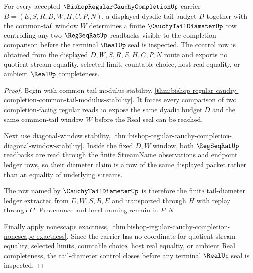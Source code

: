 \begin{theorem}
\label{thm:bishop-regular-cauchy-completion-tail-diameter-control}
For every accepted $\BishopRegularCauchyCompletionUp$ carrier $B=(E,S,R,D,W,H,C,P,N)$, a displayed dyadic tail budget $D$ together with the common-tail window $W$ determines a finite $\CauchyTailDiameterUp$ row controlling any two $\RegSeqRatUp$ readbacks visible to the completion comparison before the terminal $\RealUp$ seal is inspected. The control row is obtained from the displayed $D,W,S,R,E,H,C,P,N$ route and exports no quotient stream equality, selected limit, countable choice, host real equality, or ambient $\RealUp$ completeness.
\end{theorem}
\begin{proof}
Begin with common-tail modulus stability, \autoref{thm:bishop-regular-cauchy-completion-common-tail-modulus-stability}. It forces every comparison of two completion-facing regular reads to expose the same dyadic budget $D$ and the same common-tail window $W$ before the Real seal can be reached.

Next use diagonal-window stability, \autoref{thm:bishop-regular-cauchy-completion-diagonal-window-stability}. Inside the fixed $D,W$ window, both $\RegSeqRatUp$ readbacks are read through the finite StreamName observations and endpoint ledger rows, so their diameter claim is a row of the same displayed packet rather than an equality of underlying streams.

The row named by $\CauchyTailDiameterUp$ is therefore the finite tail-diameter ledger extracted from $D,W,S,R,E$ and transported through $H$ with replay through $C$. Provenance and local naming remain in $P,N$.

Finally apply nonescape exactness, \autoref{thm:bishop-regular-cauchy-completion-nonescape-exactness}. Since the carrier has no coordinate for quotient stream equality, selected limits, countable choice, host real equality, or ambient Real completeness, the tail-diameter control closes before any terminal $\RealUp$ seal is inspected.
\end{proof}

